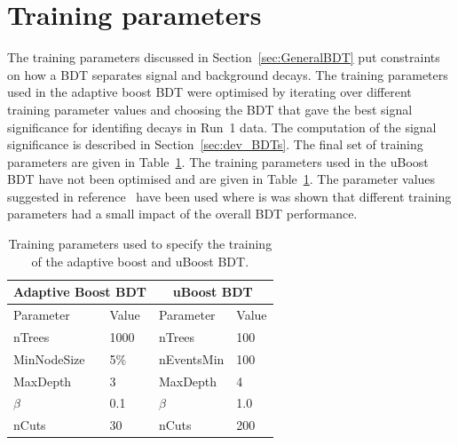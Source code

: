 \section{Training parameters}
The training parameters discussed in Section~\ref{sec:GeneralBDT} put constraints on how a BDT separates signal and background decays. 
The training parameters used in the adaptive boost BDT were optimised by iterating over different training parameter values and choosing the BDT that gave the best signal significance for identifing \bhh decays in Run~1 data. The computation of the signal significance is described in Section~\ref{sec:dev_BDTs}. %
The final set of training parameters are given in Table~\ref{tab:ELtrainingparamss}. %
The training parameters used in the uBoost BDT have not been optimised and are given in Table~\ref{tab:ELtrainingparamss}. The parameter values suggested in reference~\cite{Stevens:2013dya} have been used where is was shown that different training parameters had a small impact of the overall BDT performance. %
\begin{table}[htbp]
\begin{center}
\begin{tabular}{ll|ll}
\hline
\multicolumn{2}{c}{Adaptive Boost BDT} & \multicolumn{2}{c}{uBoost BDT} \\ \hline
Parameter & Value & Parameter & Value\\ \hline
nTrees & 1000 &  nTrees & 100\\
MinNodeSize & 5$\%$ & nEventsMin & 100 \\
MaxDepth & 3 & MaxDepth & 4 \\
$\beta$ & 0.1 & $\beta$ & 1.0 \\
nCuts & 30 & nCuts & 200 \\
\hline
\end{tabular}
\vspace{0.7cm}
\caption{Training parameters used to specify the training of the adaptive boost and uBoost BDT.}
\label{tab:ELtrainingparamss}
\end{center}
\vspace{-1.0cm}
\end{table}


